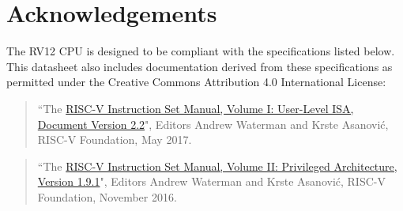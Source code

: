 \chapter{Acknowledgements}\label{acknowledgements}

The RV12 CPU is designed to be compliant with the specifications listed below.  This datasheet also includes documentation derived from these specifications as permitted under the Creative Commons Attribution 4.0 International License:

\begin{quote}
	``The \href{https://github.com/riscv/riscv-isa-manual/blob/master/release/riscv-spec-v2.2.pdf}{RISC-V Instruction Set Manual, Volume I: User-Level ISA, Document
	Version 2.2}", Editors Andrew Waterman and Krste Asanović, RISC-V
	Foundation, May 2017.
\end{quote}

\begin{quote}
	``The \href{https://github.com/riscv/riscv-isa-manual/blob/master/release/riscv-privileged-v1.9.1.pdf}{RISC-V Instruction Set Manual, Volume II: Privileged Architecture,
	Version 1.9.1}", Editors Andrew Waterman and Krste Asanović, RISC-V
	Foundation, November 2016.
\end{quote}
